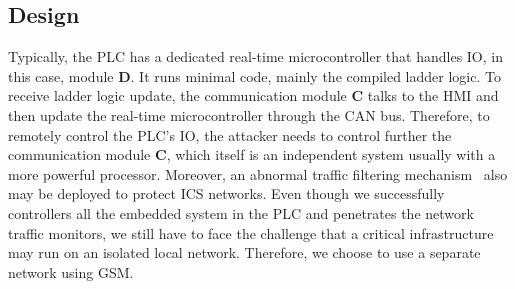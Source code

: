 %
%
%
%


\subsection{Design}

Typically, the PLC has a dedicated real-time microcontroller
that handles IO, in this case, module \textbf{D}. It runs minimal code, mainly the compiled ladder logic.  To receive ladder logic update, the communication module \textbf{C} talks to the HMI and then update the real-time microcontroller through the CAN bus. Therefore, to remotely control the PLC's IO, the attacker needs to control further the communication module \textbf{C}, which itself is an independent system usually with a more powerful processor. Moreover, an abnormal traffic filtering mechanism~\cite{kim2016abnormal} also may be deployed to protect ICS networks. Even though we successfully controllers all the embedded system in the PLC and penetrates the network traffic monitors, we still have to face the challenge that a critical infrastructure may run on an isolated local network. Therefore, we choose to use a separate network using GSM.

